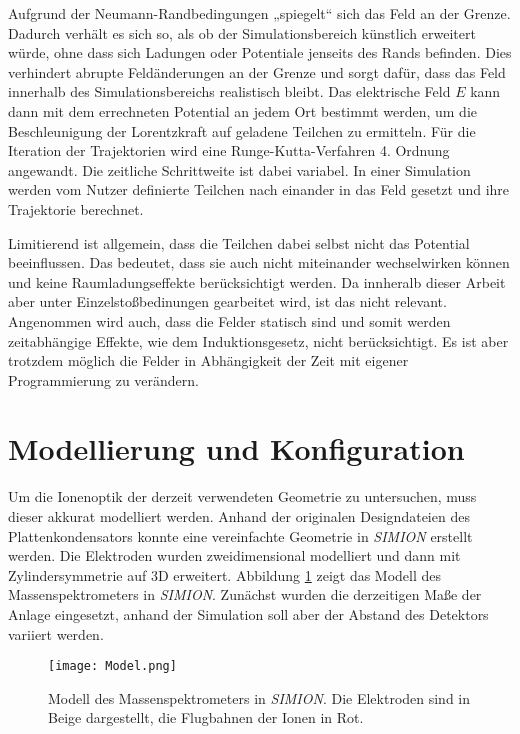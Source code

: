 Aufgrund der Neumann-Randbedingungen „spiegelt“ sich das Feld an der Grenze. Dadurch verhält es sich so, als ob der Simulationsbereich künstlich erweitert würde, ohne dass sich Ladungen oder Potentiale jenseits des Rands befinden. Dies verhindert abrupte Feldänderungen an der Grenze und sorgt dafür, dass das Feld innerhalb des Simulationsbereichs realistisch bleibt. Das elektrische Feld $E$ kann dann mit dem errechneten Potential an jedem Ort bestimmt werden, um die Beschleunigung der Lorentzkraft auf geladene Teilchen zu ermitteln. Für die Iteration der Trajektorien wird eine Runge-Kutta-Verfahren 4. Ordnung angewandt. Die zeitliche Schrittweite ist dabei variabel. In einer Simulation werden vom Nutzer definierte Teilchen nach einander in das Feld gesetzt und ihre Trajektorie berechnet. 

Limitierend ist allgemein, dass die Teilchen dabei selbst nicht das Potential beeinflussen. Das bedeutet, dass sie auch nicht miteinander wechselwirken können und keine Raumladungseffekte berücksichtigt werden. Da innheralb dieser Arbeit aber unter Einzelstoßbedinungen gearbeitet wird, ist das nicht relevant. Angenommen wird auch, dass die Felder statisch sind und somit werden zeitabhängige Effekte, wie dem Induktionsgesetz, nicht berücksichtigt. Es ist aber trotzdem möglich die Felder in Abhängigkeit der Zeit mit eigener Programmierung zu verändern.

\section{Modellierung und Konfiguration}
Um die Ionenoptik der derzeit verwendeten Geometrie zu untersuchen, muss dieser akkurat modelliert werden. Anhand der originalen Designdateien des Plattenkondensators konnte eine vereinfachte Geometrie in \textit{SIMION} erstellt werden. Die Elektroden wurden zweidimensional modelliert und dann mit Zylindersymmetrie auf 3D erweitert. Abbildung \ref{fig:model} zeigt das Modell des Massenspektrometers in \textit{SIMION}. Zunächst wurden die derzeitigen Maße der Anlage eingesetzt, anhand der Simulation soll aber der Abstand des Detektors variiert werden.

\begin{figure}
    \centering
    \texttt{[image: Model.png]}
    \caption[Modell des Massenspektrometers in \textit{SIMION}]{Modell des Massenspektrometers in \textit{SIMION}. Die Elektroden sind in Beige dargestellt, die Flugbahnen der Ionen in Rot.}
    \label{fig:model}
\end{figure}

